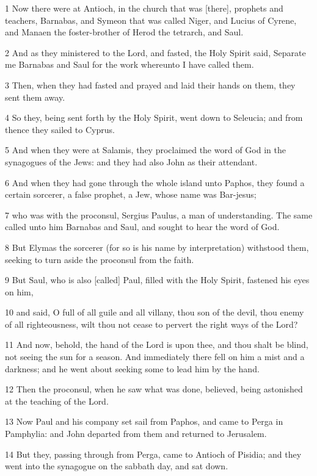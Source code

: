 \par 1 Now there were at Antioch, in the church that was [there], prophets and teachers, Barnabas, and Symeon that was called Niger, and Lucius of Cyrene, and Manaen the foster-brother of Herod the tetrarch, and Saul.
\par 2 And as they ministered to the Lord, and fasted, the Holy Spirit said, Separate me Barnabas and Saul for the work whereunto I have called them.
\par 3 Then, when they had fasted and prayed and laid their hands on them, they sent them away.
\par 4 So they, being sent forth by the Holy Spirit, went down to Seleucia; and from thence they sailed to Cyprus.
\par 5 And when they were at Salamis, they proclaimed the word of God in the synagogues of the Jews: and they had also John as their attendant.
\par 6 And when they had gone through the whole island unto Paphos, they found a certain sorcerer, a false prophet, a Jew, whose name was Bar-jesus;
\par 7 who was with the proconsul, Sergius Paulus, a man of understanding. The same called unto him Barnabas and Saul, and sought to hear the word of God.
\par 8 But Elymas the sorcerer (for so is his name by interpretation) withstood them, seeking to turn aside the proconsul from the faith.
\par 9 But Saul, who is also [called] Paul, filled with the Holy Spirit, fastened his eyes on him,
\par 10 and said, O full of all guile and all villany, thou son of the devil, thou enemy of all righteousness, wilt thou not cease to pervert the right ways of the Lord?
\par 11 And now, behold, the hand of the Lord is upon thee, and thou shalt be blind, not seeing the sun for a season. And immediately there fell on him a mist and a darkness; and he went about seeking some to lead him by the hand.
\par 12 Then the proconsul, when he saw what was done, believed, being astonished at the teaching of the Lord.
\par 13 Now Paul and his company set sail from Paphos, and came to Perga in Pamphylia: and John departed from them and returned to Jerusalem.
\par 14 But they, passing through from Perga, came to Antioch of Pisidia; and they went into the synagogue on the sabbath day, and sat down.

